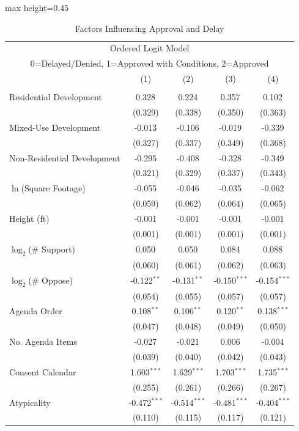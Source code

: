 \begin{table}[H]
\centering
\caption{Factors Influencing Approval and Delay}
\vspace{0.2cm}
\label{tab_ologit_results}
\begin{adjustbox}{max height=0.45\textheight}
\begin{threeparttable}
\begin{tabular}{lcccc}
\multicolumn{5}{c}{Ordered Logit Model} \\
\multicolumn{5}{c}{0=Delayed/Denied, 1=Approved with Conditions, 2=Approved} \\
\toprule
 & (1) & (2) & (3) & (4) \\
\midrule
 &  &  &  &  \\
Residential Development  & 0.328$^{}$ & 0.224$^{}$ & 0.357$^{}$ & 0.102$^{}$ \\
 & (0.329) & (0.338) & (0.350) & (0.363) \\ [1.8ex]
Mixed-Use Development  & -0.013$^{}$ & -0.106$^{}$ & -0.019$^{}$ & -0.339$^{}$ \\
 & (0.327) & (0.337) & (0.349) & (0.368) \\ [1.8ex]
Non-Residential Development  & -0.295$^{}$ & -0.408$^{}$ & -0.328$^{}$ & -0.349$^{}$ \\
 & (0.321) & (0.329) & (0.337) & (0.343) \\ [1.8ex]
$\ln$(Square Footage)  & -0.055$^{}$ & -0.046$^{}$ & -0.035$^{}$ & -0.062$^{}$ \\
 & (0.059) & (0.062) & (0.064) & (0.065) \\ [1.8ex]
Height (ft)  & -0.001$^{}$ & -0.001$^{}$ & -0.001$^{}$ & -0.001$^{}$ \\
 & (0.001) & (0.001) & (0.001) & (0.001) \\ [1.8ex]
$\log_2$(\# Support)  & 0.050$^{}$ & 0.050$^{}$ & 0.084$^{}$ & 0.088$^{}$ \\
 & (0.060) & (0.061) & (0.062) & (0.063) \\ [1.8ex]
$\log_2$(\# Oppose)  & -0.122$^{**}$ & -0.131$^{**}$ & -0.150$^{***}$ & -0.154$^{***}$ \\
 & (0.054) & (0.055) & (0.057) & (0.057) \\ [1.8ex]
Agenda Order  & 0.108$^{**}$ & 0.106$^{**}$ & 0.120$^{**}$ & 0.138$^{***}$ \\
 & (0.047) & (0.048) & (0.049) & (0.050) \\ [1.8ex]
No. Agenda Items  & -0.027$^{}$ & -0.021$^{}$ & 0.006$^{}$ & -0.004$^{}$ \\
 & (0.039) & (0.040) & (0.042) & (0.043) \\ [1.8ex]
Consent Calendar  & 1.603$^{***}$ & 1.629$^{***}$ & 1.703$^{***}$ & 1.735$^{***}$ \\
 & (0.255) & (0.261) & (0.266) & (0.267) \\ [1.8ex]
Atypicality  & -0.472$^{***}$ & -0.514$^{***}$ & -0.481$^{***}$ & -0.404$^{***}$ \\
 & (0.110) & (0.115) & (0.117) & (0.121) \\ [1.8ex]


\end{tabular}
\end{threeparttable}
\end{adjustbox}
\end{table}
